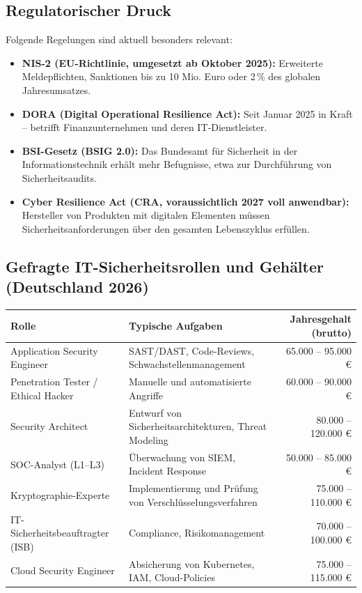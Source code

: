 \documentclass[10pt,a4paper]{article}
\begin{document}
	\subsection{Regulatorischer Druck}
	Folgende Regelungen sind aktuell besonders relevant:
	\begin{itemize}
		\item \textbf{NIS-2 (EU-Richtlinie, umgesetzt ab Oktober 2025):} Erweiterte Meldepflichten, Sanktionen bis zu 10 Mio. Euro oder 2\,\% des globalen Jahresumsatzes.
		\item \textbf{DORA (Digital Operational Resilience Act):} Seit Januar 2025 in Kraft – betrifft Finanzunternehmen und deren IT‑Dienstleister.
		\item \textbf{BSI-Gesetz (BSIG 2.0):} Das Bundesamt für Sicherheit in der Informationstechnik erhält mehr Befugnisse, etwa zur Durchführung von Sicherheitsaudits.
		\item \textbf{Cyber Resilience Act (CRA, voraussichtlich 2027 voll anwendbar):} Hersteller von Produkten mit digitalen Elementen müssen Sicherheitsanforderungen über den gesamten Lebenszyklus erfüllen.
	\end{itemize}
	
	\subsection{Gefragte IT-Sicherheitsrollen und Gehälter (Deutschland 2026)}
	\begin{center}
		\begin{tabular}{@{}l l r@{}}
			\toprule
			\textbf{Rolle} & \textbf{Typische Aufgaben} & \textbf{Jahresgehalt (brutto)} \\
			\midrule
			Application Security Engineer & SAST/DAST, Code-Reviews, Schwachstellenmanagement & 65.000 – 95.000 € \\
			Penetration Tester / Ethical Hacker & Manuelle und automatisierte Angriffe & 60.000 – 90.000 € \\
			Security Architect & Entwurf von Sicherheitsarchitekturen, Threat Modeling & 80.000 – 120.000 € \\
			SOC-Analyst (L1–L3) & Überwachung von SIEM, Incident Response & 50.000 – 85.000 € \\
			Kryptographie-Experte & Implementierung und Prüfung von Verschlüsselungsverfahren & 75.000 – 110.000 € \\
			IT-Sicherheitsbeauftragter (ISB) & Compliance, Risikomanagement & 70.000 – 100.000 € \\
			Cloud Security Engineer & Absicherung von Kubernetes, IAM, Cloud-Policies & 75.000 – 115.000 € \\
			\bottomrule
		\end{tabular}
	\end{center}
	
\end{document}
